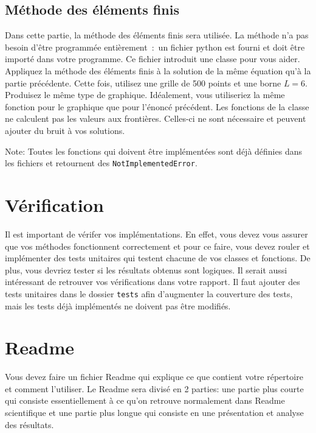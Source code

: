 \documentclass[12pt, letterpaper]{article}
\numberwithin{table}{section}
\numberwithin{figure}{section}
\numberwithin{equation}{section}
\begin{document}
\subsection{Méthode des éléments finis}\label{subsec:methode-des-elements-finis}

\noindent Dans cette partie, la méthode des éléments finis sera utilisée.
La méthode n’a pas besoin d’être programmée entièrement~:~un fichier python est fourni
et doit être importé dans votre programme.
Ce fichier introduit une classe pour vous aider.
Appliquez la méthode des éléments finis à la solution de la même équation qu’à la partie précédente.
Cette fois, utilisez une grille de 500 points et une borne $L = 6$.
Produisez le même type de graphique.
Idéalement, vous utiliseriez la même fonction pour le graphique que pour l'énoncé précédent.
Les fonctions de la classe ne calculent pas les valeurs aux frontières.
Celles-ci ne sont nécessaire et peuvent ajouter du bruit à vos solutions.

\bigskip

\noindent Note: Toutes les fonctions qui doivent être implémentées sont déjà définies dans les fichiers
et retournent des \texttt{NotImplementedError}.


\section{Vérification}\label{sec:verification}

\noindent Il est important de vérifer vos implémentations.
En effet, vous devez vous assurer que vos méthodes fonctionnent correctement et pour ce faire, vous devez rouler et
implémenter des tests unitaires qui testent chacune de vos classes et fonctions.
De plus, vous devriez tester si les résultats obtenus sont logiques.
Il serait aussi intéressant de retrouver vos vérifications dans votre rapport.
Il faut ajouter des tests unitaires dans le dossier \texttt{tests} afin d'augmenter la couverture des tests,
mais les tests déjà implémentés ne doivent pas être modifiés.


\section{Readme}\label{sec:Readme}

\noindent Vous devez faire un fichier Readme qui explique ce que contient votre répertoire et comment l'utiliser.
Le Readme sera divisé en 2 parties: une partie plus courte qui consiste essentiellement à ce qu'on retrouve normalement
dans Readme scientifique et une partie plus longue qui consiste en une présentation et analyse des résultats.
\end{document}
